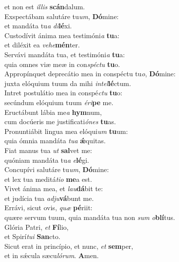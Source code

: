 \oddverse et non est \textit{il}\textit{lis} \textbf{scán}dalum.\\
\evenverse Exspectábam salutáre tu\textit{um}, \textbf{Dó}mine:~\*\\
\evenverse et mandáta tu\textit{a} \textit{di}\textbf{lé}xi.\\
\oddverse Custodívit ánima mea testimóni\textit{a} \textbf{tu}a:~\*\\
\oddverse et diléxit ea \textit{ve}\textit{he}\textbf{mén}ter.\\
\evenverse Servávi mandáta tua, et testimóni\textit{a} \textbf{tu}a:~\*\\
\evenverse quia omnes viæ meæ in con\textit{spé}\textit{ctu} \textbf{tu}o.\\
\oddverse Appropínquet deprecátio mea in conspéctu tu\textit{o}, \textbf{Dó}mine:~\*\\
\oddverse juxta elóquium tuum da mihi \textit{in}\textit{tel}\textbf{lé}ctum.\\
\evenverse Intret postulátio mea in conspé\textit{ctu} \textbf{tu}o:~\*\\
\evenverse secúndum elóquium tuum \textit{é}\textit{ri}\textbf{pe} me.\\
\oddverse Eructábunt lábia me\textit{a} \textbf{hym}num,~\*\\
\oddverse cum docúeris me justificati\textit{ó}\textit{nes} \textbf{tu}as.\\
\evenverse Pronuntiábit lingua mea elóqui\textit{um} \textbf{tu}um:~\*\\
\evenverse quia ómnia mandáta \textit{tu}\textit{a} \textbf{ǽ}quitas.\\
\oddverse Fiat manus tua \textit{ut} \textbf{sal}vet me:~\*\\
\oddverse quóniam mandáta tu\textit{a} \textit{e}\textbf{lé}gi.\\
\evenverse Concupívi salutáre tu\textit{um}, \textbf{Dó}mine:~\*\\
\evenverse et lex tua meditá\textit{ti}\textit{o} \textbf{me}a est.\\
\oddverse Vivet ánima mea, et \textit{lau}\textbf{dá}bit te:~\*\\
\oddverse et judícia tua \textit{ad}\textit{ju}\textbf{vá}bunt me.\\
\evenverse Errávi, sicut ovis, \textit{quæ} \textbf{pé}riit:~\*\\
\evenverse quære servum tuum, quia mandáta tua non \textit{sum} \textit{o}\textbf{blí}tus.\\
\oddverse Glória Patri, \textit{et} \textbf{Fí}lio,~\*\\
\oddverse et Spirí\textit{tu}\textit{i} \textbf{San}cto.\\
\evenverse Sicut erat in princípio, et nunc, \textit{et} \textbf{sem}per,~\*\\
\evenverse et in sǽcula sæcu\textit{ló}\textit{rum}. \textbf{A}men.\\
